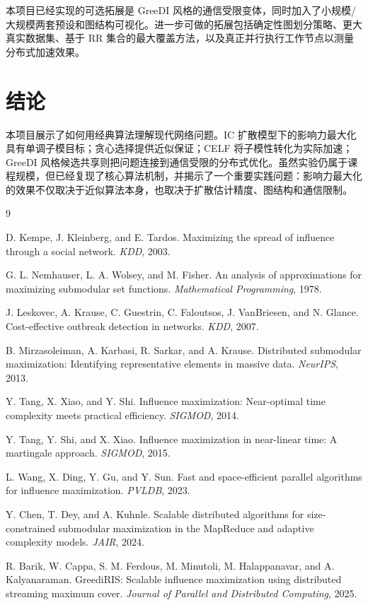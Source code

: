 \documentclass[UTF8, 11pt]{ctexart}
\begin{document}
本项目已经实现的可选拓展是 GreeDI 风格的通信受限变体，同时加入了小规模/大规模两套预设和图结构可视化。进一步可做的拓展包括确定性图划分策略、更大真实数据集、基于 RR 集合的最大覆盖方法，以及真正并行执行工作节点以测量分布式加速效果。

\section{结论}

本项目展示了如何用经典算法理解现代网络问题。IC 扩散模型下的影响力最大化具有单调子模目标；贪心选择提供近似保证；CELF 将子模性转化为实际加速；GreeDI 风格候选共享则把问题连接到通信受限的分布式优化。虽然实验仍属于课程规模，但已经复现了核心算法机制，并揭示了一个重要实践问题：影响力最大化的效果不仅取决于近似算法本身，也取决于扩散估计精度、图结构和通信限制。

\begin{thebibliography}{9}

D. Kempe, J. Kleinberg, and E. Tardos.
\newblock Maximizing the spread of influence through a social network.
\newblock \emph{KDD}, 2003.

G. L. Nemhauser, L. A. Wolsey, and M. Fisher.
\newblock An analysis of approximations for maximizing submodular set functions.
\newblock \emph{Mathematical Programming}, 1978.

J. Leskovec, A. Krause, C. Guestrin, C. Faloutsos, J. VanBriesen, and N. Glance.
\newblock Cost-effective outbreak detection in networks.
\newblock \emph{KDD}, 2007.

B. Mirzasoleiman, A. Karbasi, R. Sarkar, and A. Krause.
\newblock Distributed submodular maximization: Identifying representative elements in massive data.
\newblock \emph{NeurIPS}, 2013.

Y. Tang, X. Xiao, and Y. Shi.
\newblock Influence maximization: Near-optimal time complexity meets practical efficiency.
\newblock \emph{SIGMOD}, 2014.

Y. Tang, Y. Shi, and X. Xiao.
\newblock Influence maximization in near-linear time: A martingale approach.
\newblock \emph{SIGMOD}, 2015.

L. Wang, X. Ding, Y. Gu, and Y. Sun.
\newblock Fast and space-efficient parallel algorithms for influence maximization.
\newblock \emph{PVLDB}, 2023.

Y. Chen, T. Dey, and A. Kuhnle.
\newblock Scalable distributed algorithms for size-constrained submodular maximization in the MapReduce and adaptive complexity models.
\newblock \emph{JAIR}, 2024.

R. Barik, W. Cappa, S. M. Ferdous, M. Minutoli, M. Halappanavar, and A. Kalyanaraman.
\newblock GreediRIS: Scalable influence maximization using distributed streaming maximum cover.
\newblock \emph{Journal of Parallel and Distributed Computing}, 2025.

\end{thebibliography}
\end{document}
